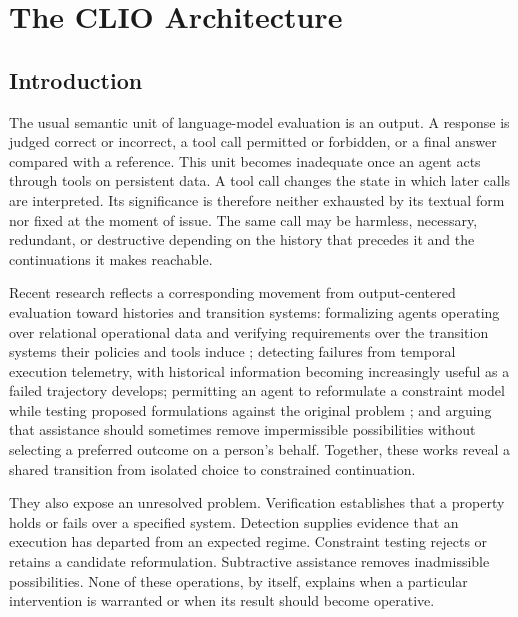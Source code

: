 
\chapter{The CLIO Architecture}
\label{ch:ch10-clio-architecture}
\section{Introduction}

The usual semantic unit of language-model evaluation is an output. A response is judged correct or incorrect, a tool call permitted or forbidden, or a final answer compared with a reference. This unit becomes inadequate once an agent acts through tools on persistent data. A tool call changes the state in which later calls are interpreted. Its significance is therefore neither exhausted by its textual form nor fixed at the moment of issue. The same call may be harmless, necessary, redundant, or destructive depending on the history that precedes it and the continuations it makes reachable.

Recent research reflects a corresponding movement from output-centered evaluation toward histories and transition systems: formalizing agents operating over relational operational data and verifying requirements over the transition systems their policies and tools induce \cite{mercado2026}; detecting failures from temporal execution telemetry, with historical information becoming increasingly useful as a failed trajectory develops; permitting an agent to reformulate a constraint model while testing proposed formulations against the original problem \cite{voboril2026}; and arguing that assistance should sometimes remove impermissible possibilities without selecting a preferred outcome on a person's behalf. Together, these works reveal a shared transition from isolated choice to constrained continuation.

They also expose an unresolved problem. Verification establishes that a property holds or fails over a specified system. Detection supplies evidence that an execution has departed from an expected regime. Constraint testing rejects or retains a candidate reformulation. Subtractive assistance removes inadmissible possibilities. None of these operations, by itself, explains when a particular intervention is warranted or when its result should become operative.

